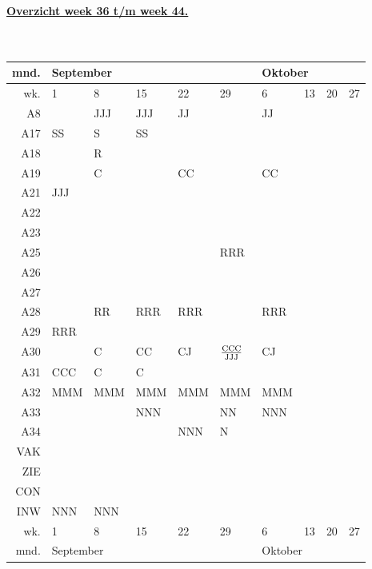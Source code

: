 {\bf
\underline{Overzicht week 36 t/m week 44.}\\ \\ \\
\small
\begin{tabular}{||r||p{3em}|p{3em}|p{3em}|p{3em}|p{3em}||p{3em}|p{3em}|p{3em}|p{3em}||} \hline 
mnd.&\multicolumn{5}{l||}{September}&\multicolumn{4}{l||}{Oktober} \\ \hline 
wk.&  1&8  &15 &22 &29 &6  &13 &20 &27 \\ \hline \hline
 A8&   &JJJ&JJJ&JJ &   &JJ &   &   &   \\ \hline
A17&SS &S  &SS &   &   &   &   &   &   \\ \hline
A18&   &R  &   &   &   &   &   &   &   \\ \hline
A19&   &C  &   &CC &   &CC &   &   &   \\ \hline
A21&JJJ&   &   &   &   &   &   &   &   \\ \hline
A22&   &   &   &   &   &   &   &   &   \\ \hline
A23&   &   &   &   &   &   &   &   &   \\ \hline
A25&   &   &   &   &RRR&   &   &   &   \\ \hline
A26&   &   &   &   &   &   &   &   &   \\ \hline
A27&   &   &   &   &   &   &   &   &   \\ \hline
A28&   &RR &RRR&RRR&   &RRR&   &   &   \\ \hline
A29&RRR&   &   &   &   &   &   &   &   \\ \hline
A30&   &C  &CC &CJ &$\frac{\rm CCC}{\rm JJJ}$
                       &CJ &   &   &   \\ \hline
A31&CCC&C  &C  &   &   &   &   &   &   \\ \hline
A32&MMM&MMM&MMM&MMM&MMM&MMM&   &   &   \\ \hline
A33&   &   &NNN&   &NN &NNN&   &   &   \\ \hline
A34&   &   &   &NNN&N  &   &   &   &   \\ \hline
VAK&   &   &   &   &   &   &   &   &   \\ \hline
ZIE&   &   &   &   &   &   &   &   &   \\ \hline
CON&   &   &   &   &   &   &   &   &   \\ \hline
INW&NNN&NNN&   &   &   &   &   &   &   \\ \hline \hline
wk.&1  &8  &15 &22 &29 &6  &13 &20 &27 \\ \hline
mnd.&\multicolumn{5}{l||}{September}&\multicolumn{4}{l||}{Oktober} \\ \hline

\end{tabular}}

